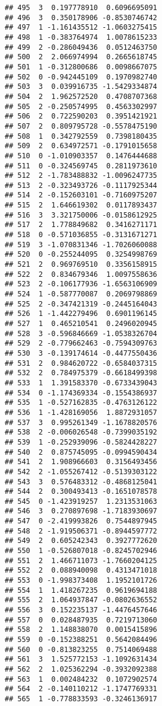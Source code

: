 \documentclass[
]{article}
\begin{document}
\begin{verbatim}
## 495  3  0.197778910  0.6096695091
## 496  3  0.350178906 -0.8530746742
## 497  1 -1.161435512 -1.0603275415
## 498  1 -0.383764974  1.0078615233
## 499  2 -0.286049436  0.0512463750
## 500  2  2.066974994  0.2665618745
## 501  1 -0.312800686  0.0098667075
## 502  0 -0.942445109  0.1970982740
## 503  3  0.039916735 -1.5429334874
## 504  2  1.962572520  0.4708707368
## 505  2 -0.250574995  0.4563302997
## 506  2  0.722590203  0.3951421921
## 507  2  0.809795728 -0.5578475190
## 508  1  0.342792559  0.7398180435
## 509  2  0.634972571 -0.1791015658
## 510  0 -1.010903357  0.1476444688
## 511  0 -0.324569745  0.2811973610
## 512  2 -1.783488832 -1.0096247735
## 513  2 -0.323493726 -0.1117925344
## 514  2 -0.152603101 -0.7160975207
## 515  2  1.646619302  0.0117893437
## 516  3  3.321750006 -0.0158612925
## 517  2  1.778849682  0.3416271171
## 518  0 -0.571036855 -0.3131671271
## 519  3 -1.070831346 -1.7026060088
## 520  0 -0.255244095  0.3254998769
## 521  2  0.969769510  0.3356158915
## 522  2  0.834679346  1.0097558636
## 523  2 -0.106177936 -1.6563106909
## 524  1 -0.587770087  0.2069798869
## 525  2 -0.347421319 -0.2445164043
## 526  1 -1.442279496  0.6901196145
## 527  1  0.465210541  0.2496020945
## 528  3 -0.596846669 -1.0538326704
## 529  2 -0.779662463 -0.7594309763
## 530  3 -0.139174614 -0.4477550436
## 531  2  0.984620722 -0.6584037315
## 532  2  0.784975379 -0.6618499398
## 533  1  1.391583370 -0.6733439043
## 534  0 -1.174369334 -0.1554386937
## 535  1 -0.527162835 -0.4763126122
## 536  1 -1.428169056  1.8872931057
## 537  3  0.995261349 -1.1678820576
## 538  2 -0.006026548 -0.7399035192
## 539  1 -0.252939096 -0.5824428227
## 540  2  0.875745095 -0.0994590434
## 541  2  1.908966603  0.3156493456
## 542  2 -1.055267412 -0.5139303122
## 543  3  0.576483312 -0.4868125041
## 544  2  0.300493413 -0.1651078578
## 545  0 -1.423919257  1.2313531063
## 546  3  0.270897698 -1.7183930697
## 547  0 -2.419993826  0.7544897945
## 548  2 -1.919506371 -0.8944597772
## 549  2  0.605242343  0.3927772620
## 550  1 -0.526807018 -0.8245702946
## 551  2  1.466711073 -1.7660204125
## 552  2  0.088940098  0.4313471018
## 553  0 -1.998373408  1.1952101726
## 554  1  1.418267235  0.9619694188
## 555  2  1.064937847 -0.0802636552
## 556  3  0.152235137 -1.4476457646
## 557  0  0.028487935  0.7219713060
## 558  2  1.148838070  0.0015415896
## 559  0 -0.152388251  0.5642084496
## 560  0 -0.813823255  0.7514069488
## 561  3  1.525772153 -1.1092631434
## 562  2  1.025362294 -0.3932092388
## 563  1  0.002484232  0.1072902574
## 564  2 -0.140110212 -1.1747769331
## 565  1 -0.778833593 -0.3246136917

\end{verbatim}
\end{document}
